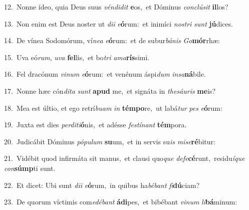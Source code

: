 {\numbfont\textcolor{\numbcolor}{12.}}~Nonne ídeo, quia Deus suus \textit{vén}\-\textit{di}\textit{dit} \textbf{e}\-os,~\star et Dóminus \textit{con}\-\textit{clú}\textit{sit} \textbf{il}\-los?\par
{\numbfont\textcolor{\numbcolor}{13.}}~Non enim est Deus noster ut \textit{di}\-\textit{i} \textit{e}\-\textbf{ó}rum:~\star et inimíci \textit{nos}\-\textit{tri} \textit{sunt} \textbf{jú}\-dices.\par
{\numbfont\textcolor{\numbcolor}{14.}}~De vínea Sodomórum, ví\-\textit{ne}\-\textit{a} \textit{e}\-\textbf{ó}rum:~\star et de subur\-\textit{bá}\-\textit{nis} \textit{Go}\-\textbf{mór}rhæ:\par
{\numbfont\textcolor{\numbcolor}{15.}}~Uva eó\-\textit{rum}\-, \textit{u}\-\textit{va} \textbf{fel}\-lis,~\star et bo\textit{tri} \textit{a}\-\textit{ma}\textbf{rís}simi.\par
{\numbfont\textcolor{\numbcolor}{16.}}~Fel dracónum \textit{vi}\-\textit{num} \textit{e}\-\textbf{ó}rum:~\star et venénum áspi\textit{dum} \textit{in}\-\textit{sa}\textbf{ná}bile.\par
{\numbfont\textcolor{\numbcolor}{17.}}~Nonne hæc cón\-\textit{di}\-\textit{ta} \textit{sunt} \textbf{a}\-\textbf{pud} me,~\star et signáta in \textit{the}\-\textit{sáu}\textit{ris} \textbf{me}\-is?\par
{\numbfont\textcolor{\numbcolor}{18.}}~Mea est últio, et ego retrí\-\textit{bu}\-\textit{am} \textit{in} \textbf{tém}\-\textbf{po}re,~\star ut labá\textit{tur} \textit{pes} \textit{e}\-\textbf{ó}rum:\par
{\numbfont\textcolor{\numbcolor}{19.}}~Juxta est dies \textit{per}\-\textit{di}\textit{ti}\textbf{ó}nis,~\star et adésse \textit{fes}\-\textit{tí}\textit{nant} \textbf{tém}\-pora.\par
{\numbfont\textcolor{\numbcolor}{20.}}~Judicábit Dóminus \textit{pó}\-\textit{pu}\textit{lum} \textbf{su}\-um,~\star et in servis su\textit{is} \textit{mi}\-\textit{se}\textbf{ré}bitur:\par
{\numbfont\textcolor{\numbcolor}{21.}}~Vidébit quod infirmáta sit manus,~\dagger et clausi quo\textit{que} \textit{de}\-\textit{fe}\textbf{cé}runt,~\star residu\-\textit{í}\-\textit{que} \textit{con}\-\textbf{súmp}ti sunt.\par
{\numbfont\textcolor{\numbcolor}{22.}}~Et dicet: Ubi sunt \textit{di}\-\textit{i} \textit{e}\-\textbf{ó}rum,~\star in quibus ha\-\textit{bé}\-\textit{bant} \textit{fi}\-\textbf{dú}ciam?\par
{\numbfont\textcolor{\numbcolor}{23.}}~De quorum víctimis com\-\textit{e}\-\textit{dé}\textit{bant} \textbf{á}\-\textbf{di}pes,~\star et bibébant \textit{vi}\-\textit{num} \textit{li}\-\textbf{bá}minum:\par
